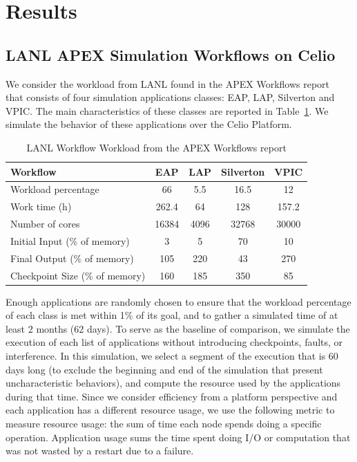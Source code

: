 \section{Results}\label{sec:results}

\subsection{LANL APEX Simulation Workflows on Celio}

We consider the workload from LANL found in the APEX Workflows
report~\cite{apex} that consists of four simulation applications
classes: EAP, LAP, Silverton and VPIC. The main characteristics of
these classes are reported in Table~\ref{table:lanl}. We simulate the
behavior of these applications over the Celio Platform. 

\begin{table}
\begin{tabular}{|l|c|c|c|c|}
\hline
 Workflow & EAP & LAP & Silverton & VPIC \\\hline
Workload percentage & 66 & 5.5 & 16.5 & 12 \\\hline
Work time (h) & 262.4 & 64 & 128 & 157.2 \\\hline
Number of cores & 16384 & 4096 & 32768 & 30000 \\\hline
Initial Input (\% of memory) &  3 & 5 & 70 & 10 \\\hline
Final Output (\% of memory) & 105 & 220 & 43 & 270 \\\hline
Checkpoint Size (\% of memory) & 160 & 185 & 350 & 85 \\\hline
\end{tabular}
\caption{LANL Workflow Workload from the APEX Workflows report\label{table:lanl}}
\end{table}

Enough applications are randomly chosen to ensure that the workload
percentage of each class is met within 1\% of its goal, and to gather
a simulated time of at least 2 months (62 days). To serve as the
baseline of comparison, we simulate the execution of each list of
applications without introducing checkpoints, faults, or
interference. In this simulation, we select a segment of the execution
that is 60 days long (to exclude the beginning and end of the
simulation that present uncharacteristic behaviors), and compute 
the resource used by the applications during that time. Since we
consider efficiency from a platform perspective and each application
has a different resource usage, we use the following metric to measure
resource usage: the sum of time each node spends doing a specific
operation. Application usage sums the time spent doing I/O or
computation that was not wasted by a restart due to a failure.

